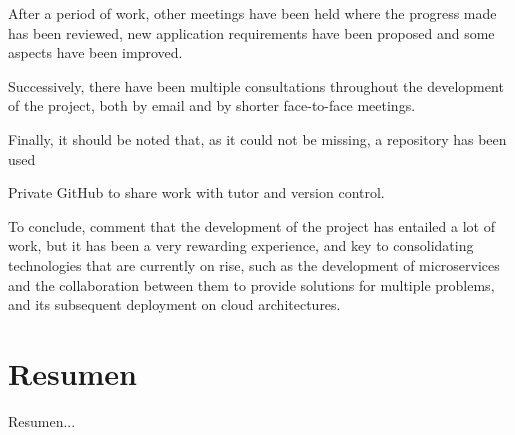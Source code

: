 After a period of work, other meetings have been held where the progress made has been reviewed, new application requirements have been proposed and some aspects have been improved.

Successively, there have been multiple consultations throughout the development of the project, both by email and by shorter face-to-face meetings.

Finally, it should be noted that, as it could not be missing, a repository has been used

Private GitHub to share work with tutor and version control.

To conclude, comment that the development of the project has entailed a lot of work, but it has been a very rewarding experience, and key to consolidating technologies that are currently on rise, such as the development of microservices and the collaboration between them to provide solutions for multiple problems, and its subsequent deployment on cloud architectures.

\chapter*{Resumen\label{00summary}}

Resumen...

